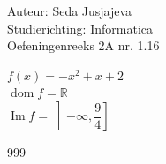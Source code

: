 \documentclass[a4paper]{article}
\begin{document}
\noindent \large Auteur: Seda Jusjajeva\\
\noindent \large Studierichting: Informatica\\
\noindent \large Oefeningenreeks 2A nr. 1.16 \\

\medskip

\normalsize


$f(x) = -x^2 + x + 2$ \\

$\operatorname{dom}f = \mathbb{R}$ \\

$\operatorname{Im}f = \left]-\infty, \dfrac{9}{4}\right]$ \\




\begin{thebibliography}{999}
\end{thebibliography}
\end{document}
